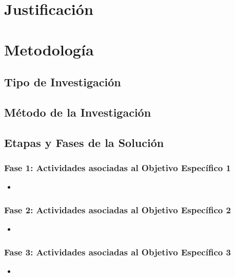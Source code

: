 \documentclass[12pt]{article}
\begin{document}
\section{Justificación}

\section{Metodología}

\subsection{Tipo de Investigación}

\subsection{Método de la Investigación}

\subsection{Etapas y Fases de la Solución}

\subsubsection{Fase 1: Actividades asociadas al Objetivo Específico 1}
\begin{itemize}
    \item 
\end{itemize}

\subsubsection{Fase 2: Actividades asociadas al Objetivo Específico 2}
\begin{itemize}
    \item 
\end{itemize}

\subsubsection{Fase 3: Actividades asociadas al Objetivo Específico 3}
\begin{itemize}
    \item 
\end{itemize}
\end{document}
